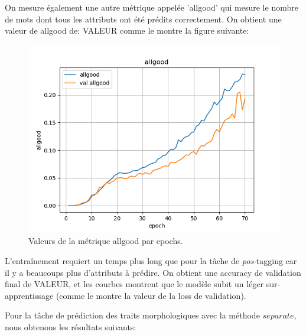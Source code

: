 \documentclass[a4paper]{article}
\begin{document}
On mesure également une autre métrique appelée 'allgood' qui mesure le nombre de mots dont tous les attributs 
ont été prédits correctement. On obtient une valeur de allgood de: VALEUR comme le
montre la figure suivante:

\begin{figure}[H]
    \centering
    \includegraphics[width=0.45\linewidth]{../logs/get_morphy_sep0_French_3/allgood.png}
    \caption{Valeurs de la métrique allgood par epochs.}
\end{figure}


L'entraînement requiert un temps plus long que pour la tâche de \textit{pos}-tagging car il y a beaucoups plus 
d'attributs à prédire.
On obtient une accuracy de validation final de VALEUR, et les courbes montrent que le modèle subit un 
léger sur-apprentissage (comme le montre la valeur de la loss de validation).

Pour la tâche de prédiction des traits morphologiques avec la méthode $separate$, nous obtenons les 
résultats suivants: %
\end{document}
